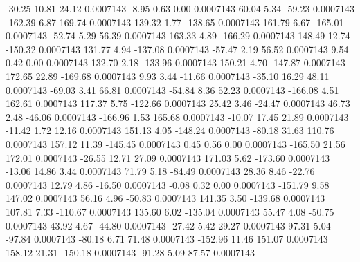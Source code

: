       -30.25       10.81       24.12     0.0007143
       -8.95        0.63        0.00     0.0007143
       60.04        5.34      -59.23     0.0007143
     -162.39        6.87      169.74     0.0007143
      139.32        1.77     -138.65     0.0007143
      161.79        6.67     -165.01     0.0007143
      -52.74        5.29       56.39     0.0007143
      163.33        4.89     -166.29     0.0007143
      148.49       12.74     -150.32     0.0007143
      131.77        4.94     -137.08     0.0007143
      -57.47        2.19       56.52     0.0007143
        9.54        0.42        0.00     0.0007143
      132.70        2.18     -133.96     0.0007143
      150.21        4.70     -147.87     0.0007143
      172.65       22.89     -169.68     0.0007143
        9.93        3.44      -11.66     0.0007143
      -35.10       16.29       48.11     0.0007143
      -69.03        3.41       66.81     0.0007143
      -54.84        8.36       52.23     0.0007143
     -166.08        4.51      162.61     0.0007143
      117.37        5.75     -122.66     0.0007143
       25.42        3.46      -24.47     0.0007143
       46.73        2.48      -46.06     0.0007143
     -166.96        1.53      165.68     0.0007143
      -10.07       17.45       21.89     0.0007143
      -11.42        1.72       12.16     0.0007143
      151.13        4.05     -148.24     0.0007143
      -80.18       31.63      110.76     0.0007143
      157.12       11.39     -145.45     0.0007143
        0.45        0.56        0.00     0.0007143
     -165.50       21.56      172.01     0.0007143
      -26.55       12.71       27.09     0.0007143
      171.03        5.62     -173.60     0.0007143
      -13.06       14.86        3.44     0.0007143
       71.79        5.18      -84.49     0.0007143
       28.36        8.46      -22.76     0.0007143
       12.79        4.86      -16.50     0.0007143
       -0.08        0.32        0.00     0.0007143
     -151.79        9.58      147.02     0.0007143
       56.16        4.96      -50.83     0.0007143
      141.35        3.50     -139.68     0.0007143
      107.81        7.33     -110.67     0.0007143
      135.60        6.02     -135.04     0.0007143
       55.47        4.08      -50.75     0.0007143
       43.92        4.67      -44.80     0.0007143
      -27.42        5.42       29.27     0.0007143
       97.31        5.04      -97.84     0.0007143
      -80.18        6.71       71.48     0.0007143
     -152.96       11.46      151.07     0.0007143
      158.12       21.31     -150.18     0.0007143
      -91.28        5.09       87.57     0.0007143
